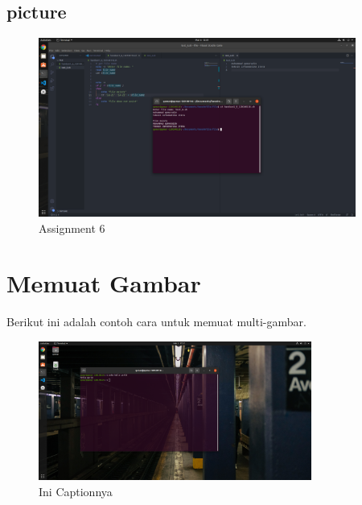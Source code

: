 \documentclass[11pt,a4paper]{article}
\begin{document}
\subsection*{picture}
\begin{figure}[h]
	\centering
	\includegraphics[width=0.93\textwidth]{figure/task_6.png}
	\caption{Assignment 6}
\end{figure}

\newpage
\section{Memuat Gambar}
Berikut ini adalah contoh cara untuk memuat multi-gambar.
\begin{figure}[h]
    \centering
    \includegraphics[width=0.8\textwidth]{figure/tut1_bagian1.png}
    \caption{Ini Captionnya}
    \label{fig:my_label}
\end{figure}

\newpage


\end{document}
